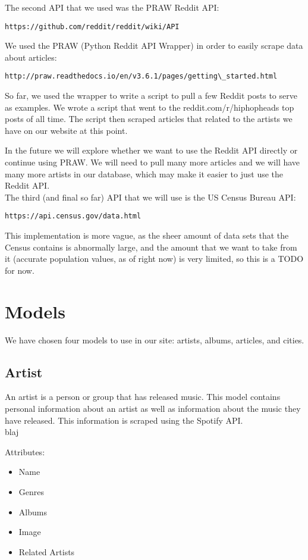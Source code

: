 \documentclass{scrartcl}
\begin{document}
\noindent
The second API that we used was the PRAW Reddit API:
\begin{verbatim}https://github.com/reddit/reddit/wiki/API\end{verbatim}

\noindent
We used the PRAW (Python Reddit API Wrapper) in order to easily scrape data about articles:
\begin{verbatim}http://praw.readthedocs.io/en/v3.6.1/pages/getting\_started.html\end{verbatim}

So far, we used the wrapper to write a script to pull a few Reddit posts to serve as examples. We wrote a script that went to the reddit.com/r/hiphopheads top posts of all time. The script then scraped articles that related to the artists we have on our website at this point.

In the future we will explore whether we want to use the Reddit API directly or continue using PRAW. We will need to pull many more articles and we will have many more artists in our database, which may make it easier to just use the Reddit API.\\

\noindent
The third (and final so far) API that we will use is the US Census Bureau API:
\begin{verbatim}https://api.census.gov/data.html\end{verbatim}

This implementation is more vague, as the sheer amount of data sets that the Census contains is abnormally large, and the amount that we want to take from it (accurate population values, as of right now) is very limited, so this is a TODO for now.

\section{Models}
We have chosen four models to use in our site: artists, albums, articles, and cities.

\subsection{Artist}
An artist is a person or group that has released music. This model contains personal information about an artist as well as information about the music they have released. This information is scraped using the Spotify API.\\ blaj

Attributes:
\begin{itemize}
    \item Name
    \item Genres
    \item Albums
    \item Image
    \item Related Artists
\end{itemize}
\end{document}
